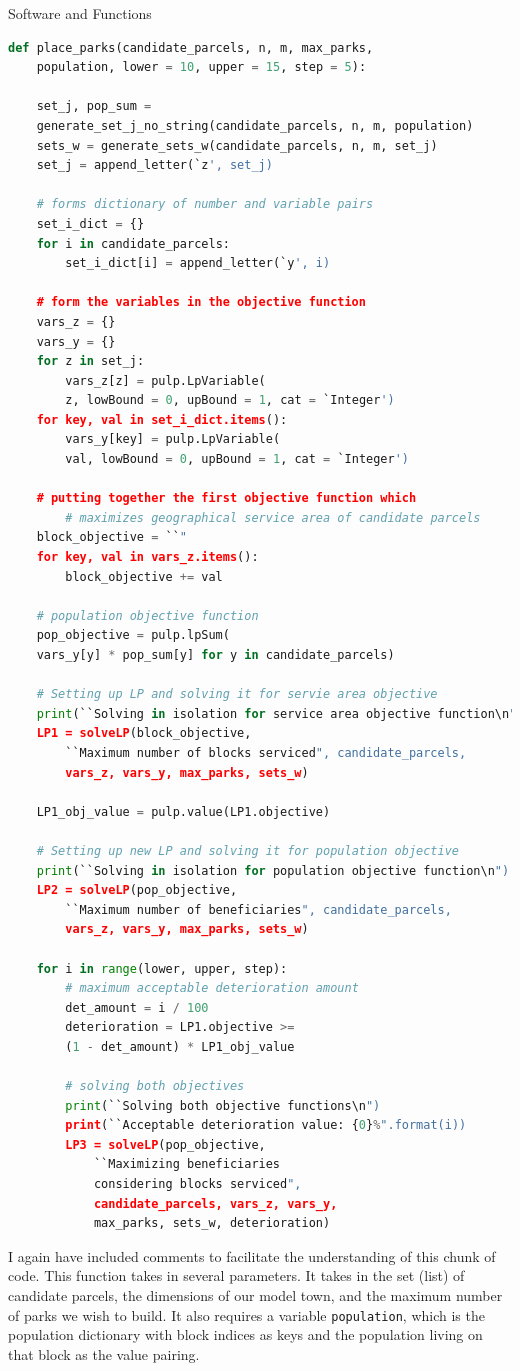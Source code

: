 \documentclass[12pt]{pom_thesis}
\theoremstyle{definition}
\begin{document}
\begin{chapter}{Software and Functions}
\begin{lstlisting}[language = Python, caption = Runs the solution strategy and prints out solutions for many different values of $\alpha_k$., xleftmargin = -50pt]
def place_parks(candidate_parcels, n, m, max_parks, 
	population, lower = 10, upper = 15, step = 5):

	set_j, pop_sum = 
	generate_set_j_no_string(candidate_parcels, n, m, population)
	sets_w = generate_sets_w(candidate_parcels, n, m, set_j)
	set_j = append_letter(`z', set_j)
	
	# forms dictionary of number and variable pairs
	set_i_dict = {}
	for i in candidate_parcels:
		set_i_dict[i] = append_letter(`y', i) 

	# form the variables in the objective function
	vars_z = {}
	vars_y = {}
	for z in set_j:
		vars_z[z] = pulp.LpVariable(
		z, lowBound = 0, upBound = 1, cat = `Integer')
	for key, val in set_i_dict.items():
		vars_y[key] = pulp.LpVariable(
		val, lowBound = 0, upBound = 1, cat = `Integer')

	# putting together the first objective function which
    	# maximizes geographical service area of candidate parcels
	block_objective = ``"
	for key, val in vars_z.items():
		block_objective += val

	# population objective function
	pop_objective = pulp.lpSum(
	vars_y[y] * pop_sum[y] for y in candidate_parcels)

	# Setting up LP and solving it for servie area objective
	print(``Solving in isolation for service area objective function\n")
	LP1 = solveLP(block_objective, 
		``Maximum number of blocks serviced", candidate_parcels, 
		vars_z, vars_y, max_parks, sets_w)

	LP1_obj_value = pulp.value(LP1.objective)

	# Setting up new LP and solving it for population objective
	print(``Solving in isolation for population objective function\n")
	LP2 = solveLP(pop_objective, 
		``Maximum number of beneficiaries", candidate_parcels, 
		vars_z, vars_y, max_parks, sets_w)

	for i in range(lower, upper, step):
		# maximum acceptable deterioration amount
		det_amount = i / 100
		deterioration = LP1.objective >= 
		(1 - det_amount) * LP1_obj_value
		
		# solving both objectives
		print(``Solving both objective functions\n")
		print(``Acceptable deterioration value: {0}%".format(i))
		LP3 = solveLP(pop_objective, 
			``Maximizing beneficiaries 
			considering blocks serviced", 
			candidate_parcels, vars_z, vars_y, 
			max_parks, sets_w, deterioration)
\end{lstlisting}
	I again have included comments to facilitate the understanding of this chunk of code. This function takes in several parameters. It takes in the set (list) of candidate parcels, the dimensions of our model town, and the maximum number of parks we wish to build. It also requires a variable \verb-population-, which is the population dictionary with block indices as keys and the population living on that block as the value pairing. 
	

\end{chapter}
\end{document}
